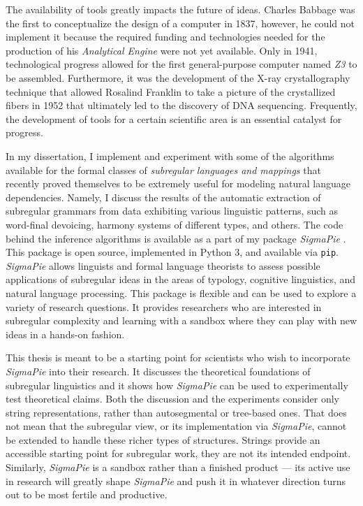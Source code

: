 The availability of tools greatly impacts the future of ideas.
Charles Babbage was the first to conceptualize the design of a computer in 1837, however, he could not implement it because the required funding and technologies needed for the production of his \emph{Analytical Engine} were not yet available.
Only in 1941, technological progress allowed for the first general-purpose computer named \emph{Z3} to be assembled.
Furthermore, it was the development of the X-ray crystallography technique that allowed Rosalind Franklin to take a picture of the crystallized fibers in 1952 that ultimately led to the discovery of DNA sequencing.
Frequently, the development of tools for a certain scientific area is an essential catalyst for progress.


In my dissertation, I implement and experiment with some of the algorithms available for the formal classes of \emph{subregular languages and mappings} that recently proved themselves to be extremely useful for modeling natural language dependencies.
Namely, I discuss the results of the automatic extraction of subregular grammars from data exhibiting various linguistic patterns, such as word-final devoicing, harmony systems of different types, and others.
The code behind the inference algorithms is available as a part of my package \emph{SigmaPie} \href{https://pypi.org/project/SigmaPie/}{\faCube} \citep{sigmapie}.
This package is open source, implemented in Python 3, and available via \texttt{pip}.
\emph{SigmaPie} allows linguists and formal language theorists to assess possible applications of subregular ideas in the areas of typology, cognitive linguistics, and natural language processing.
This package is flexible and can be used to explore a variety of research questions.
It provides researchers who are interested in subregular complexity and learning with a sandbox where they can play with new ideas in a hands-on fashion.

This thesis is meant to be a starting point for scientists who wish to incorporate \emph{SigmaPie} into their research.
It discusses the theoretical foundations of subregular linguistics and it shows how \emph{SigmaPie} can be used to experimentally test theoretical claims.
Both the discussion and the experiments consider only string representations, rather than autosegmental or tree-based ones.
That does not mean that the subregular view, or its implementation via \emph{SigmaPie}, cannot be extended to handle these richer types of structures.
Strings provide an accessible starting point for subregular work, they are not its intended endpoint.
Similarly, \emph{SigmaPie} is a sandbox rather than a finished product --- its active use in research will greatly shape \emph{SigmaPie} and push it in whatever direction turns out to be most fertile and productive.


